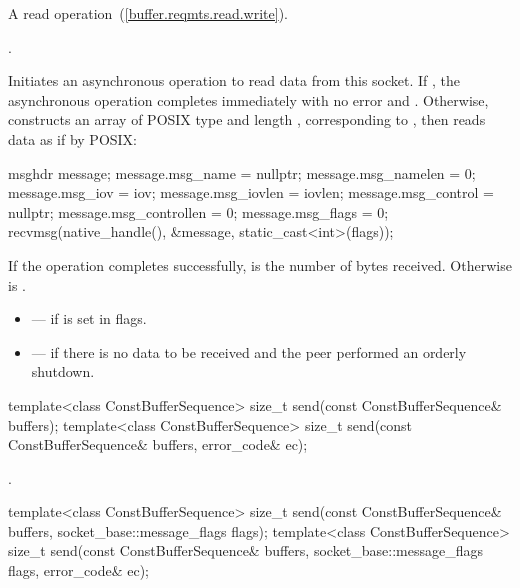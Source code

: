 \begin{itemdescr}
\pnum
A read operation~(\ref{buffer.reqmts.read.write}).

\pnum
\completionsig {}.

\pnum
\effects Initiates an asynchronous operation to read data from this socket. If , the asynchronous operation completes immediately with no error and . Otherwise, constructs an array  of POSIX type  and length , corresponding to , then reads data as if by POSIX:
\begin{codeblock}
msghdr message;
message.msg_name = nullptr;
message.msg_namelen = 0;
message.msg_iov = iov;
message.msg_iovlen = iovlen;
message.msg_control = nullptr;
message.msg_controllen = 0;
message.msg_flags = 0;
recvmsg(native_handle(), &message, static_cast<int>(flags));
\end{codeblock}


\pnum
If the operation completes successfully,  is the number of bytes received. Otherwise  is .

\pnum
\errors
\begin{itemize}
\item
{} --- if  is set in flags.
\item
{} --- if there is no data to be received and the peer performed an orderly shutdown.
\end{itemize}
\end{itemdescr}

\begin{itemdecl}
template<class ConstBufferSequence>
  size_t send(const ConstBufferSequence& buffers);
template<class ConstBufferSequence>
  size_t send(const ConstBufferSequence& buffers, error_code& ec);
\end{itemdecl}

\begin{itemdescr}
\pnum
\returns {}.
\end{itemdescr}

\begin{itemdecl}
template<class ConstBufferSequence>
  size_t send(const ConstBufferSequence& buffers,
              socket_base::message_flags flags);
template<class ConstBufferSequence>
  size_t send(const ConstBufferSequence& buffers,
              socket_base::message_flags flags, error_code& ec);
\end{itemdecl}

